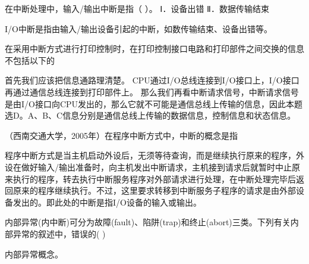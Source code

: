 \question 在中断处理中，输入/输出中断是指（ ）。 Ⅰ．设备出错 Ⅱ．数据传输结束
\par{}
\begin{solution}I/O中断是指由输入/输出设备引起的中断，如数传输结束、设备出错等。
\end{solution}
\question 在采用中断方式进行打印控制时，在打印控制接口电路和打印部件之间交换的信息不包括以下的
\par{}
\begin{solution}首先我们应该把信息通路理清楚。
CPU通过I/O总线连接到I/O接口上，I/O接口再通过通信总线连接到打印部件上。
那么我们再看中断请求信号，中断请求信号是由I/O接口向CPU发出的，那么它就不可能是通信总线上传输的信息，因此本题选D。A、B、C信息分别是通信总线上传输的数据信息，控制信息和状态信息。
\end{solution}
\question （西南交通大学，2005年）在程序中断方式中，中断的概念是指
\par{}
\begin{solution}程序中断方式是当主机启动外设后，无须等待查询，而是继续执行原来的程序，外设在做好输入/输出准备时，向主机发出中断请求，主机接到请求后就暂时中止原来执行的程序，转去执行中断服务程序对外部请求进行处理，在中断处理完毕后返回原来的程序继续执行。不过，这里要求转移到中断服务子程序的请求是由外部设备发出的。即此处的中断是指I/O设备的输入或输出。
\end{solution}
\question 内部异常(内中断)可分为故障(fault)、陷阱(trap)和终止(abort)三类。下列有关内部异常的叙述中，错误的(
)
\par{}
\begin{solution}内部异常概念。
\end{solution}
